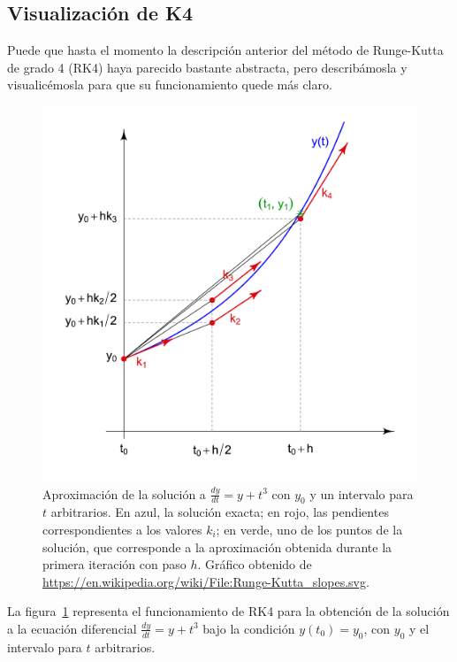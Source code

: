 \subsection{Visualización de K4}

Puede que hasta el momento la descripción anterior del método de Runge-Kutta de grado 4 (RK4) haya parecido bastante abstracta, pero describámosla y visualicémosla para que su funcionamiento quede más claro.

\begin{figure}[H]\label{fig:slopes}
	\centering
	\includegraphics[scale=0.6]{../auxiliary/assets/Runge-Kutta_slopes.png}
	\caption{Aproximación de la solución a \(\frac{dy}{dt} = y + t^{3}\) con \(y_{0}\) y un intervalo para \(t\) arbitrarios. En azul, la solución exacta; en rojo, las pendientes correspondientes a los valores \(k_{i}\); en verde, uno de los puntos de la solución, que corresponde a la aproximación obtenida durante la primera iteración con paso \(h\). Gráfico obtenido de \url{https://en.wikipedia.org/wiki/File:Runge-Kutta_slopes.svg}.}
\end{figure}
La figura~\ref{fig:slopes} representa el funcionamiento de RK4 para la obtención de la solución a la ecuación diferencial \(\frac{dy}{dt} = y + t^{3}\) bajo la condición \(y(t_{0}) = y_{0}\), con \(y_{0}\) y el intervalo para \(t\) arbitrarios.

